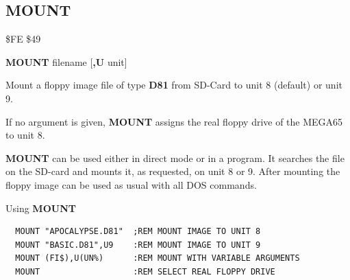 \subsection{MOUNT}
\begin{description}[leftmargin=2cm,style=nextline]
\item [Token:] \$FE \$49
\item [Format:] {\bf MOUNT} filename [{\bf,U} unit]
\item [Usage:] Mount a floppy image file of type {\bf D81}
   from SD-Card to unit 8 (default) or unit 9.

   If no argument is given, {\bf MOUNT} assigns the real floppy drive
   of the MEGA65 to unit 8.

   \filenamedefinition

   \unitdefinition



\item [Remarks:]
      {\bf MOUNT} can be used either in direct mode or in a program.
      It searches the file on the SD-card and mounts it, as requested,
      on unit 8 or 9. After mounting the floppy image can be used
      as usual with all DOS commands.

\item [Examples:] Using {\bf MOUNT}
\begin{tcolorbox}[colback=black,coltext=white]
\verbatimfont{\codefont}
\begin{verbatim}
  MOUNT "APOCALYPSE.D81"  ;REM MOUNT IMAGE TO UNIT 8
  MOUNT "BASIC.D81",U9    :REM MOUNT IMAGE TO UNIT 9
  MOUNT (FI$),U(UN%)      :REM MOUNT WITH VARIABLE ARGUMENTS
  MOUNT                   :REM SELECT REAL FLOPPY DRIVE
\end{verbatim}
\end{tcolorbox}
\end{description}


\newpage
